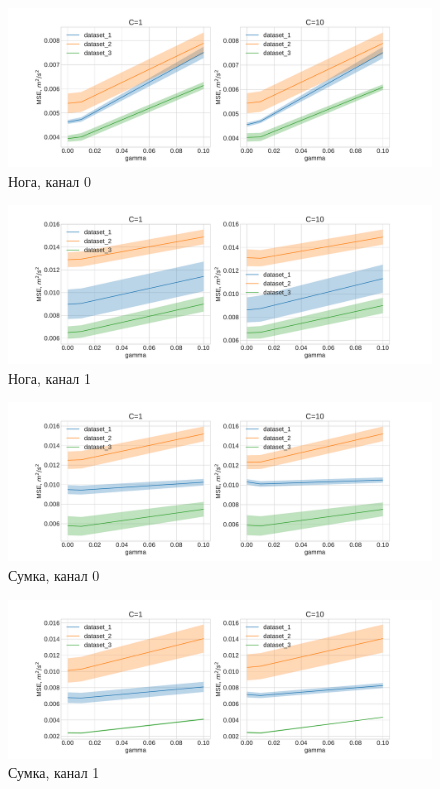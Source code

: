 \documentclass[12pt,twoside]{article}
\begin{document}
    \begin{figure}[H]
    \includegraphics[scale=0.4]{charts/leg_chn0_C=10.pdf}
    \caption{Нога, канал 0}
    \label{fig:image}
    \end{figure}
    
    \begin{figure}[H]
    \includegraphics[scale=0.4]{charts/leg_chn1_C=10.pdf}
    \caption{Нога, канал 1}
    \label{fig:image}
    \end{figure}
    
    \begin{figure}[H]
    \includegraphics[scale=0.4]{charts/bag_chn0_C=10.pdf}
    \caption{Сумка, канал 0}
    \label{fig:image}
    \end{figure}
    
    \begin{figure}[H]
    \includegraphics[scale=0.4]{charts/bag_chn1_C=10.pdf}
    \caption{Сумка, канал 1}
    \label{fig:image}
    \end{figure}
    
\end{document}
